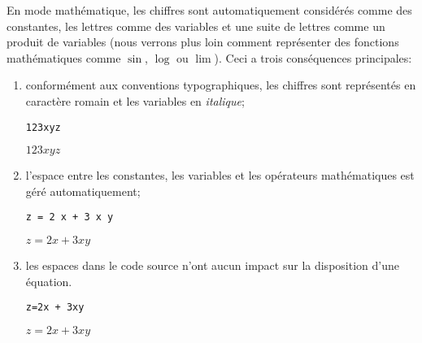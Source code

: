 En mode mathématique, les chiffres sont automatiquement considérés
comme des constantes, les lettres comme des variables et une suite de
lettres comme un produit de variables (nous verrons plus loin comment
représenter des fonctions mathématiques comme $\sin$, $\log$ ou
$\lim$). Ceci a trois conséquences principales:
\begin{enumerate}
\item conformément aux conventions typographiques, les chiffres sont
  représentés en caractère \textrm{romain} et les variables en
  \emph{italique};
  \begin{demo}
    \begin{texample}
\begin{lstlisting}
123xyz
\end{lstlisting}
      \producing
      $123xyz$
    \end{texample}
  \end{demo}
\item l'espace entre les constantes, les variables et les opérateurs
  mathématiques est géré automatiquement;
  \begin{demo}
    \begin{texample}
\begin{lstlisting}
z = 2 x + 3 x y
\end{lstlisting}
    \producing
    $z = 2 x + 3 x y$
    \end{texample}
  \end{demo}
\item les espaces dans le code source n'ont aucun impact sur la
  disposition d'une équation.
  \begin{demo}
    \begin{texample}
\begin{lstlisting}
z=2x + 3xy
\end{lstlisting}
    \producing
    $z=2x + 3xy$
    \end{texample}
  \end{demo}
\end{enumerate}



